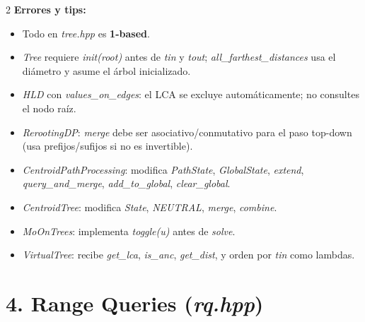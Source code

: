 \documentclass[10pt]{article}
\begin{document}
\begin{multicols}{2}
\textbf{Errores y tips:}
\begin{itemize}\setlength{\itemsep}{1pt}
  \item Todo en \textit{tree.hpp} es \textbf{1-based}.
  \item \textit{Tree} requiere \textit{init(root)} antes de \textit{tin} y \textit{tout}; \textit{all\_farthest\_distances} usa el diámetro y asume el árbol inicializado.
  \item \textit{HLD} con \textit{values\_on\_edges}: el LCA se excluye automáticamente; no consultes el nodo raíz.
  \item \textit{RerootingDP}: \textit{merge} debe ser asociativo/conmutativo para el paso top-down (usa prefijos/sufijos si no es invertible).
  \item \textit{CentroidPathProcessing}: modifica \textit{PathState}, \textit{GlobalState}, \textit{extend}, \textit{query\_and\_merge}, \textit{add\_to\_global}, \textit{clear\_global}.
  \item \textit{CentroidTree}: modifica \textit{State}, \textit{NEUTRAL}, \textit{merge}, \textit{combine}.
  \item \textit{MoOnTrees}: implementa \textit{toggle(u)} antes de \textit{solve}.
  \item \textit{VirtualTree}: recibe \textit{get\_lca}, \textit{is\_anc}, \textit{get\_dist}, y orden por \textit{tin} como lambdas.
\end{itemize}

\section*{4. Range Queries (\textit{rq.hpp})}


\end{multicols}
\end{document}

